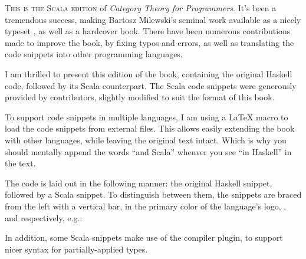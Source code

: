 
\lettrine[lhang=0.17]{T}{his is the Scala edition} of \emph{Category Theory for Programmers}.
It's been a tremendous success, making Bartosz Milewski's seminal work available as a nicely 
typeset , as well as a hardcover book. There have been numerous contributions made
to improve the book, by fixing typos and errors, as well as translating the code snippets into
other programming languages.

I am thrilled to present this edition of the book, containing the original Haskell code, followed by
its Scala counterpart. The Scala code snippets were generously provided by 
 contributors, slightly 
modified to suit the format of this book.

To support code snippets in multiple languages, I am using a \LaTeX{} macro to load the code snippets
from external files. This allows easily extending the book with other languages, while leaving the 
original text intact. Which is why you should mentally append the words ``and Scala'' whenver you see
``in Haskell'' in the text.

The code is laid out in the following manner: the original Haskell snippet, followed by a Scala snippet.
To distinguish between them, the snippets are braced from the left with a vertical bar, in the primary
color of the language's logo, , 
and  respectively, e.g.:

\unskip
{}
\NoIndentAfterThis

In addition, some Scala snippets make use of the 
 compiler plugin, to support nicer syntax for partially-applied types.